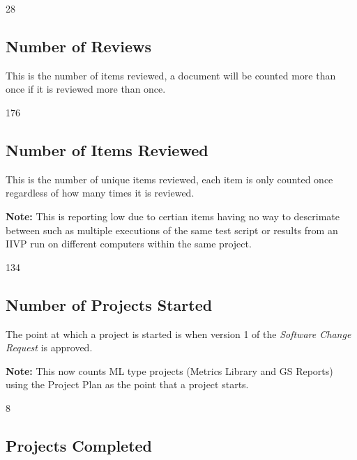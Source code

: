 \documentclass{article}
\begin{document}
\begin{Schunk}
\begin{Soutput}
[1] 28
\end{Soutput}
\end{Schunk}

\subsection{Number of Reviews}
This is the number of items reviewed, a document will be counted more than once
if it is reviewed more than once.

\begin{Schunk}
\begin{Soutput}
[1] 176
\end{Soutput}
\end{Schunk}

\subsection{Number of Items Reviewed}
This is the number of unique items reviewed, each item is only counted once
regardless of how many times it is reviewed.

\textbf{Note:} This is reporting low due to certian items having no way to
descrimate between such as multiple executions of the same test script or
results from an IIVP run on different computers within the same project.

\begin{Schunk}
\begin{Soutput}
[1] 134
\end{Soutput}
\end{Schunk}

\subsection{Number of Projects Started}
The point at which a project is started is when version 1 of the \textit{Software
Change Request} is approved.

\textbf{Note:} This now counts ML type projects (Metrics Library and GS Reports)
using the Project Plan as the point that a project starts.

\begin{Schunk}
\begin{Soutput}
[1] 8
\end{Soutput}
\end{Schunk}

\subsection{Projects Completed}
\end{document}
